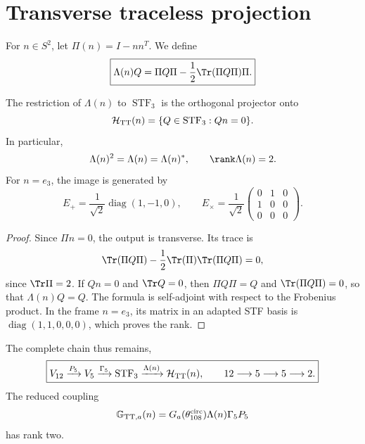 \section{Transverse traceless projection}

For \(n\in S^2\), let \(\Pi(n)=I-nn^T\). We define
\begin{equation}
\label{rm:eq:gravity-lambda-tt}
\boxed{
\Lambda(n)Q
=\Pi Q\Pi-\frac12\Tr(\Pi Q\Pi)\Pi.}
\end{equation}

\begin{theorem}
\label{rm:thm:gravity-tt}
The restriction of \(\Lambda(n)\) to \(\operatorname{STF}_3\) is the
orthogonal projector onto
\begin{equation}
\label{rm:eq:gravity-htt}
\mathcal H_{\rm TT}(n)
=\{Q\in\operatorname{STF}_3:Qn=0\}.
\end{equation}
In particular,
\begin{equation}
\label{rm:eq:gravity-lambda-properties}
\Lambda(n)^2=\Lambda(n)=\Lambda(n)^*,
\qquad \rank\Lambda(n)=2.
\end{equation}
For \(n=e_3\), the image is generated by
\begin{equation}
\label{rm:eq:gravity-plus-cross}
E_+=\frac1{\sqrt2}\operatorname{diag}(1,-1,0),
\qquad
E_\times=\frac1{\sqrt2}
\begin{pmatrix}0&1&0\\1&0&0\\0&0&0\end{pmatrix}.
\end{equation}
\end{theorem}

\begin{proof}
Since \(\Pi n=0\), the output is transverse. Its trace is
\[
\Tr(\Pi Q\Pi)-\frac12\Tr(\Pi)\Tr(\Pi Q\Pi)=0,
\]
since \(\Tr\Pi=2\). If \(Qn=0\) and \(\Tr Q=0\), then
\(\Pi Q\Pi=Q\) and \(\Tr(\Pi Q\Pi)=0\), so that
\(\Lambda(n)Q=Q\). The formula is self-adjoint with respect to the
Frobenius product. In the frame \(n=e_3\), its matrix in an adapted STF basis is
\(\operatorname{diag}(1,1,0,0,0)\), which proves the rank.
\end{proof}

The complete chain thus remains,
\begin{equation}
\label{rm:eq:gravity-12-5-5-2}
\boxed{
V_{12}\xrightarrow{P_5}V_5
\xrightarrow{\Gamma_5}\operatorname{STF}_3
\xrightarrow{\Lambda(n)}\mathcal H_{\rm TT}(n),
\qquad 12\longrightarrow5\longrightarrow5\longrightarrow2.}
\end{equation}
The reduced coupling
\begin{equation}
\label{rm:eq:gravity-effective-map}
\mathbb G_{{\rm TT},a}(n)
=G_a(\theta_{108}^{\rm circ})\Lambda(n)\Gamma_5P_5
\end{equation}
has rank two.
